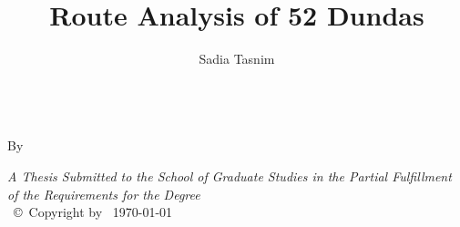 \documentclass[
11pt, %
oneside, %
english, %
singlespacing, %
]{macthesis} %
\title{Route Analysis of 52 Dundas}
\author{Sadia Tasnim}
\date{}
\def\blankpage{%
      \clearpage%
      \thispagestyle{empty}%
      \addtocounter{page}{-1}%
      \null%
      \clearpage}
\begin{document}
\sloppy

\frontmatter %

\pagestyle{plain} %

\vspace{6cm}
\begin{center}
\ttitle
\end{center}
\clearpage

\begin{center}

\vfill
\textsc{\Large \ttitle} \\

\vfill
{By \authorname\, \bdeg }


 \vfill
{\large \textit{A Thesis Submitted to the School of Graduate Studies in the Partial Fulfillment of the Requirements for the Degree \degreename}}\\

\vfill
{\large \univname\, \copyright\, Copyright by \authorname\, \today}\\[4cm] %

\end{center}
\blankpage
\clearpage



\blankpage
\clearpage

\end{document}
